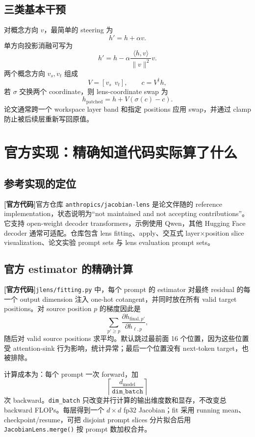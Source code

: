 \documentclass[10.5pt,a4paper]{ctexart}
\newcommand{\CodeTag}{\textbf{[官方代码]}}
\begin{document}
\subsection{三类基本干预}
对概念方向 $v$，最简单的 steering 为
\[
h' = h+\alpha v.
\]
单方向投影消融可写为
\[
h' = h-\alpha\frac{\langle h,v\rangle}{\|v\|^2}v.
\]
两个概念方向 $v_s,v_t$ 组成
\[
V=[v_s\ \ v_t],\qquad c=V^\dagger h,
\]
若 $\sigma$ 交换两个 coordinate，则 lens-coordinate swap 为
\[
h_{\mathrm{patched}}
=h+V(\sigma(c)-c).
\]
论文通常跨一个 workspace layer band 和指定 positions 应用 swap，并通过 clamp 防止被后续层重新写回原值。

\section{官方实现：精确知道代码实际算了什么}

\subsection{参考实现的定位}
\CodeTag 官方仓库 \texttt{anthropics/jacobian-lens} 是论文伴随的 reference implementation，状态说明为“not maintained and not accepting contributions”。它支持 open-weight decoder transformers，示例使用 Qwen，其他 Hugging Face decoder 通常可适配。仓库包含 lens fitting、apply、交互式 layer$\times$position slice visualization、论文实验 prompt sets 与 lens evaluation prompt sets。

\subsection{官方 estimator 的精确计算}
\CodeTag \texttt{jlens/fitting.py} 中，每个 prompt 的 estimator 对最终 residual 的每一个 output dimension 注入 one-hot cotangent，并同时放在所有 valid target positions。对 source position $p$ 的梯度因此是
\[
\sum_{p'\ge p}
\frac{\partial h_{\mathrm{final},p'}}{\partial h_{\ell,p}},
\]
随后对 valid source positions 求平均。默认跳过最前面 16 个位置，因为这些位置受 attention-sink 行为影响，统计异常；最后一个位置没有 next-token target，也被排除。

计算成本为：每个 prompt 一次 forward，加
\[
\left\lceil \frac{d_{\mathrm{model}}}{\texttt{dim\_batch}}\right\rceil
\]
次 backward。\texttt{dim\_batch} 只改变并行计算的输出维度数和显存，不改变总 backward FLOPs。每层得到一个 $d\times d$ fp32 Jacobian；fit 采用 running mean、checkpoint/resume，可把 disjoint prompt slices 分片拟合后用 \texttt{JacobianLens.merge()} 按 prompt 数加权合并。
\end{document}
